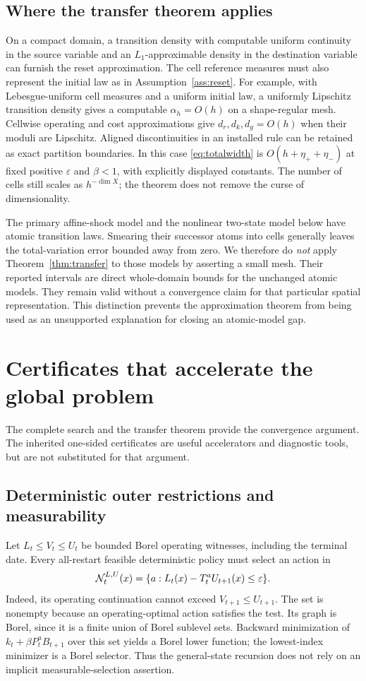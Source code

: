 \subsection{Where the transfer theorem applies}
On a compact domain, a transition density with computable uniform continuity in the source variable and an $L_1$-approximable density in the destination variable can furnish the reset approximation. The cell reference measures must also represent the initial law as in Assumption~\ref{ass:reset}. For example, with Lebesgue-uniform cell measures and a uniform initial law, a uniformly Lipschitz transition density gives a computable $\alpha_h=O(h)$ on a shape-regular mesh. Cellwise operating and cost approximations give $d_r,d_k,d_g=O(h)$ when their moduli are Lipschitz. Aligned discontinuities in an installed rule can be retained as exact partition boundaries. In this case \eqref{eq:totalwidth} is $O(h+\eta_++\eta_-)$ at fixed positive $\varepsilon$ and $\beta<1$, with explicitly displayed constants. The number of cells still scales as $h^{-\dim X}$; the theorem does not remove the curse of dimensionality.

The primary affine-shock model and the nonlinear two-state model below have atomic transition laws. Smearing their successor atoms into cells generally leaves the total-variation error bounded away from zero. We therefore do \emph{not} apply Theorem~\ref{thm:transfer} to those models by asserting a small mesh. Their reported intervals are direct whole-domain bounds for the unchanged atomic models. They remain valid without a convergence claim for that particular spatial representation. This distinction prevents the approximation theorem from being used as an unsupported explanation for closing an atomic-model gap.

\section{Certificates that accelerate the global problem}\label{sec:certificates}
The complete search and the transfer theorem provide the convergence argument. The inherited one-sided certificates are useful accelerators and diagnostic tools, but are not substituted for that argument.

\subsection{Deterministic outer restrictions and measurability}
Let $L_t\leq V_t\leq U_t$ be bounded Borel operating witnesses, including the terminal date. Every all-restart feasible deterministic policy must select an action in
\begin{equation}\label{eq:necessary}
 \mathcal N_t^{L,U}(x)=\{a:L_t(x)-T_t^aU_{t+1}(x)\leq\varepsilon\}.
\end{equation}
Indeed, its operating continuation cannot exceed $V_{t+1}\leq U_{t+1}$. The set is nonempty because an operating-optimal action satisfies the test. Its graph is Borel, since it is a finite union of Borel sublevel sets. Backward minimization of $k_t+\beta P_t^aB_{t+1}$ over this set yields a Borel lower function; the lowest-index minimizer is a Borel selector. Thus the general-state recursion does not rely on an implicit measurable-selection assertion.

